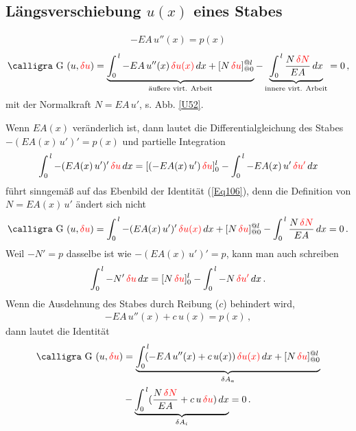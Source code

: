 {{{{{\textcolor{sectionTitleBlue}{\subsection{L\"{a}ngsverschiebung $u(x)$ eines Stabes}}}
\vspace{-0.7cm}
\begin{align}
- EA\,u''(x) = p(x)
\end{align}
\begin{align}\label{Eq106}
\text{\normalfont\calligra G\,\,}(u,\textcolor{red}{\delta u}) = \underbrace{\int_0^{\,l} - EA\,u''(x)\,\textcolor{red}{\delta u(x)}\,dx + [N\,\textcolor{red}{\delta u}]_{@0}^{@l}}_{\text{\"{a}u{\ss}ere virt. Arbeit}} - \underbrace{\int_0^{\,l} \frac{N\,\textcolor{red}{\delta N}}{EA}\,dx}_{\text{innere virt. Arbeit}} = 0\,,
\end{align}
mit der Normalkraft $N = EA\,u'$, s. Abb. \ref{U52}.

Wenn $EA(x)$ ver\"{a}nderlich ist, dann lautet die Differentialgleichung des Stabes $- (EA(x)\,u')' = p(x)$ und partielle Integration
\begin{align}
\int_0^{\,l} - (EA(x)\,u')'\,\textcolor{red}{\delta u}\,dx = [(- EA(x)\,u')\,\textcolor{red}{\delta u}]_0^l - \int_0^{\,l} - EA(x)\,u'\,\textcolor{red}{\delta u'}\,dx
\end{align}
f\"{u}hrt sinngem\"{a}{\ss} auf das Ebenbild der Identit\"{a}t (\ref{Eq106}), denn die Definition von $N = EA(x)\,u'$ \"{a}ndert sich nicht
\begin{align}\label{Eq106}
\text{\normalfont\calligra G\,\,}(u,\textcolor{red}{\delta u}) = \int_0^{\,l} - (EA(x)\,u')'\,\textcolor{red}{\delta u(x)}\,dx + [N\,\textcolor{red}{\delta u}]_{@0}^{@l} - \int_0^{\,l} \frac{N\,\textcolor{red}{\delta N}}{EA}\,dx = 0\,.
\end{align}
Weil $- N' = p$ dasselbe ist wie $- (EA(x)\,u')' = p$, kann man auch schreiben
\begin{align}
\int_0^{\,l} - N'\,\textcolor{red}{\delta u}\,dx = [N\,\textcolor{red}{\delta u}]_0^l - \int_0^{\,l} -N\,\textcolor{red}{\delta u'}\,dx\,.
\end{align}
Wenn die Ausdehnung des Stabes durch Reibung ($c$) behindert wird,
\begin{align}
- EA\,u''(x) + c\,u(x) = p(x)\,,
\end{align}
dann lautet die Identit\"{a}t
\begin{align}
\text{\normalfont\calligra G\,\,}(u,\textcolor{red}{\delta u}) &= \underbrace{\int_0^{\,l}\!\!\! (- EA\,u''(x) + c\,u(x))\,\textcolor{red}{\delta u(x)}\,dx + [N\,\textcolor{red}{\delta u}]_{@0}^{@l}}_{\delta A_a}\nn \\
& - \underbrace{\int_0^{\,l} (\frac{N\,\textcolor{red}{\delta N}}{EA} + c\,u\,\textcolor{red}{\delta u})\,dx}_{\delta A_i} = 0\,.
\end{align}

}}}}
